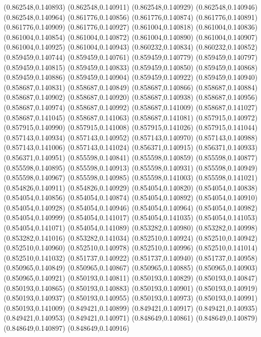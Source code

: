 (0.862548,0.140893)
(0.862548,0.140911)
(0.862548,0.140929)
(0.862548,0.140946)
(0.862548,0.140964)
(0.861776,0.140856)
(0.861776,0.140874)
(0.861776,0.140891)
(0.861776,0.140909)
(0.861776,0.140927)
(0.861004,0.140818)
(0.861004,0.140836)
(0.861004,0.140854)
(0.861004,0.140872)
(0.861004,0.140890)
(0.861004,0.140907)
(0.861004,0.140925)
(0.861004,0.140943)
(0.860232,0.140834)
(0.860232,0.140852)
(0.859459,0.140744)
(0.859459,0.140761)
(0.859459,0.140779)
(0.859459,0.140797)
(0.859459,0.140815)
(0.859459,0.140833)
(0.859459,0.140850)
(0.859459,0.140868)
(0.859459,0.140886)
(0.859459,0.140904)
(0.859459,0.140922)
(0.859459,0.140940)
(0.858687,0.140831)
(0.858687,0.140849)
(0.858687,0.140866)
(0.858687,0.140884)
(0.858687,0.140902)
(0.858687,0.140920)
(0.858687,0.140938)
(0.858687,0.140956)
(0.858687,0.140974)
(0.858687,0.140992)
(0.858687,0.141009)
(0.858687,0.141027)
(0.858687,0.141045)
(0.858687,0.141063)
(0.858687,0.141081)
(0.857915,0.140972)
(0.857915,0.140990)
(0.857915,0.141008)
(0.857915,0.141026)
(0.857915,0.141044)
(0.857143,0.140934)
(0.857143,0.140952)
(0.857143,0.140970)
(0.857143,0.140988)
(0.857143,0.141006)
(0.857143,0.141024)
(0.856371,0.140915)
(0.856371,0.140933)
(0.856371,0.140951)
(0.855598,0.140841)
(0.855598,0.140859)
(0.855598,0.140877)
(0.855598,0.140895)
(0.855598,0.140913)
(0.855598,0.140931)
(0.855598,0.140949)
(0.855598,0.140967)
(0.855598,0.140985)
(0.855598,0.141003)
(0.855598,0.141021)
(0.854826,0.140911)
(0.854826,0.140929)
(0.854054,0.140820)
(0.854054,0.140838)
(0.854054,0.140856)
(0.854054,0.140874)
(0.854054,0.140892)
(0.854054,0.140910)
(0.854054,0.140928)
(0.854054,0.140946)
(0.854054,0.140964)
(0.854054,0.140982)
(0.854054,0.140999)
(0.854054,0.141017)
(0.854054,0.141035)
(0.854054,0.141053)
(0.854054,0.141071)
(0.854054,0.141089)
(0.853282,0.140980)
(0.853282,0.140998)
(0.853282,0.141016)
(0.853282,0.141034)
(0.852510,0.140924)
(0.852510,0.140942)
(0.852510,0.140960)
(0.852510,0.140978)
(0.852510,0.140996)
(0.852510,0.141014)
(0.852510,0.141032)
(0.851737,0.140922)
(0.851737,0.140940)
(0.851737,0.140958)
(0.850965,0.140849)
(0.850965,0.140867)
(0.850965,0.140885)
(0.850965,0.140903)
(0.850965,0.140921)
(0.850193,0.140811)
(0.850193,0.140829)
(0.850193,0.140847)
(0.850193,0.140865)
(0.850193,0.140883)
(0.850193,0.140901)
(0.850193,0.140919)
(0.850193,0.140937)
(0.850193,0.140955)
(0.850193,0.140973)
(0.850193,0.140991)
(0.850193,0.141009)
(0.849421,0.140899)
(0.849421,0.140917)
(0.849421,0.140935)
(0.849421,0.140953)
(0.849421,0.140971)
(0.848649,0.140861)
(0.848649,0.140879)
(0.848649,0.140897)
(0.848649,0.140916)
